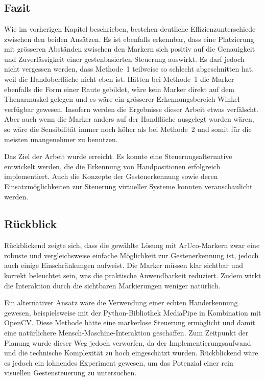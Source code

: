 \chapter{\chapFive}
\label{cha:chapter5} %

\begingroup
\fontsize{12pt}{14pt}\selectfont

\section{Fazit}
Wie im vorherigen Kapitel beschrieben, bestehen deutliche Effizienzunterschiede zwischen den beiden Ansätzen.
Es ist ebenfalls erkennbar, dass eine Platzierung mit grösseren Abständen zwischen den Markern sich positiv auf die Genauigkeit und Zuverlässigkeit einer gestenbasierten Steuerung auswirkt.
Es darf jedoch nicht vergessen werden, dass Methode~1 teilweise so schlecht abgeschnitten hat, weil die Handoberfläche nicht eben ist.
Hätten bei Methode~1 die Marker ebenfalls die Form einer Raute gebildet, wäre kein Marker direkt auf dem Thenarmuskel gelegen und es wäre ein grösserer Erkennungsbereich-Winkel verfügbar gewesen.
Insofern werden die Ergebnisse dieser Arbeit etwas verfälscht.
Aber auch wenn die Marker anders auf der Handfläche ausgelegt worden wären, so wäre die Sensibilität immer noch höher als bei Methode~2 und somit für die meisten unangenehmer zu benutzen.

Das Ziel der Arbeit wurde erreicht.
Es konnte eine Steuerungsalternative entwickelt werden, die die Erkennung von Handpositionen erfolgreich implementiert.
Auch die Konzepte der Gestenerkennung sowie deren Einsatzmöglichkeiten zur Steuerung virtueller Systeme konnten veranschaulicht werden.

\section{Rückblick}

Rückblickend zeigte sich, dass die gewählte Lösung mit ArUco-Markern zwar eine robuste und vergleichsweise einfache Möglichkeit zur Gestenerkennung ist, jedoch auch einige Einschränkungen aufweist.
Die Marker müssen klar sichtbar und korrekt beleuchtet sein, was die praktische Anwendbarkeit reduziert.
Zudem wirkt die Interaktion durch die sichtbaren Markierungen weniger natürlich.

Ein alternativer Ansatz wäre die Verwendung einer echten Handerkennung gewesen, beispielsweise mit der Python-Bibliothek MediaPipe in Kombination mit OpenCV.
Diese Methode hätte eine markerlose Steuerung ermöglicht und damit eine natürlichere Mensch-Maschine-Interaktion geschaffen.
Zum Zeitpunkt der Planung wurde dieser Weg jedoch verworfen, da der Implementierungsaufwand und die technische Komplexität zu hoch eingeschätzt wurden.
Rückblickend wäre es jedoch ein lohnendes Experiment gewesen, um das Potenzial einer rein visuellen Gestensteuerung zu untersuchen.

